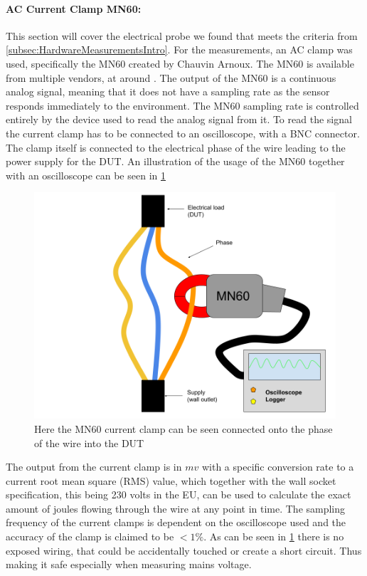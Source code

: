 \paragraph*{AC Current Clamp MN60:}

This section will cover the electrical probe we found that meets the criteria from \cref{subsec:HardwareMeasurementsIntro}. For the measurements, an AC clamp was used, specifically the MN60 created by Chauvin Arnoux\cite{ChauvinArnoux}. The MN60 is available from multiple vendors, at around . The output of the MN60 is a continuous analog signal, meaning that it does not have a sampling rate as the sensor responds immediately to the environment\cite{agarwal2005foundations}. The MN60 sampling rate is controlled entirely by the device used to read the analog signal from it\cite{agarwal2005foundations}. To read the signal the current clamp has to be connected to an oscilloscope, with a BNC connector\cite{ClampDoc}. The clamp itself is connected to the electrical phase of the wire leading to the power supply for the DUT. An illustration of the usage of the MN60 together with an oscilloscope can be seen in \cref{fig:clampSetup}

\begin{figure}[ht]
    \centering
    \includegraphics*[scale=0.25]{figures/CLAMP.png}
    \caption{Here the MN60 current clamp can be seen connected onto the phase of the wire into the DUT}
    \label{fig:clampSetup}
\end{figure}

The output from the current clamp is in $mv$ with a specific conversion rate to a current root mean square (RMS) value, which together with the wall socket specification, this being 230 volts in the EU\cite{sik}, can be used to calculate the exact amount of joules flowing through the wire at any point in time. The sampling frequency of the current clamps is dependent on the oscilloscope used and the accuracy of the clamp is claimed to be $<1\%$\cite{ClampDoc}. As can be seen in \ref{fig:clampSetup} there is no exposed wiring, that could be accidentally touched or create a short circuit. Thus making it safe especially when measuring mains voltage.


